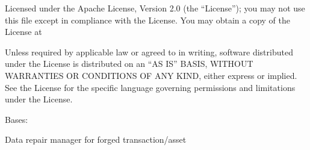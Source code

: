 \documentclass[letterpaper,10pt,english]{sphinxmanual}
\begin{document}
Licensed under the Apache License, Version 2.0 (the “License”);
you may not use this file except in compliance with the License.
You may obtain a copy of the License at
\begin{quote}

\end{quote}

Unless required by applicable law or agreed to in writing, software
distributed under the License is distributed on an “AS IS” BASIS,
WITHOUT WARRANTIES OR CONDITIONS OF ANY KIND, either express or implied.
See the License for the specific language governing permissions and
limitations under the License.

\begin{fulllineitems}
\label{\detokenize{bbc1.core.repair_manager:bbc1.core.repair_manager.RepairManager}}
Bases: 

Data repair manager for forged transaction/asset

\begin{fulllineitems}
\label{\detokenize{bbc1.core.repair_manager:bbc1.core.repair_manager.RepairManager.REQUEST_REPAIR_ASSET_FILE}}
\end{fulllineitems}


\begin{fulllineitems}
\label{\detokenize{bbc1.core.repair_manager:bbc1.core.repair_manager.RepairManager.REQUEST_REPAIR_TRANSACTION}}
\end{fulllineitems}


\begin{fulllineitems}
\label{\detokenize{bbc1.core.repair_manager:bbc1.core.repair_manager.RepairManager.REQUEST_TO_SEND_ASSET_FILE}}
\end{fulllineitems}


\end{fulllineitems}
\end{document}
